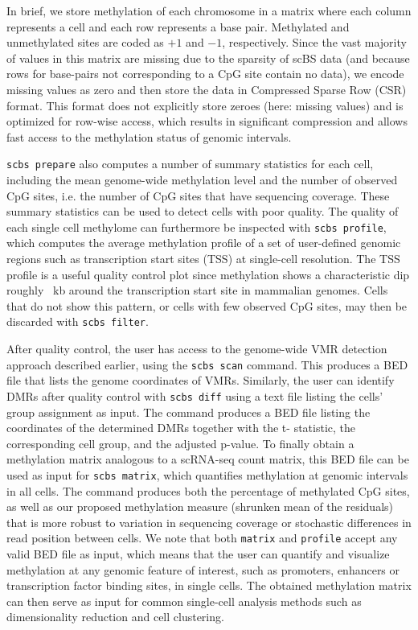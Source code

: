 \documentclass[twocolumn,10pt]{article}
\begin{document}
In brief, we store methylation of each chromosome in a matrix where each column represents a cell and each row represents a base pair.
Methylated and unmethylated sites are coded as $+1$ and $-1$, respectively.
Since the vast majority of values in this matrix are missing due to the sparsity of scBS data (and because rows for base-pairs not corresponding to a CpG site contain no data), we encode missing values as zero and then store the data in Compressed Sparse Row (CSR) format.
This format does not explicitly store zeroes (here: missing values) and is optimized for row-wise access, which results in significant compression and allows fast access to the methylation status of genomic intervals.

\texttt{scbs prepare} also computes a number of summary statistics for each cell, including the mean genome-wide methylation level and the number of observed CpG sites, i.e.
the number of CpG sites that have sequencing coverage.
These summary statistics can be used to detect cells with poor quality.
The quality of each single cell methylome can furthermore be inspected with \texttt{scbs profile}, which computes the average methylation profile of a set of user-defined genomic regions such as transcription start sites (TSS) at single-cell resolution.
The TSS profile is a useful quality control plot since methylation shows a characteristic dip roughly ~kb around the transcription start site in mammalian genomes.
Cells that do not show this pattern, or cells with few observed CpG sites, may then be discarded with \texttt{scbs filter}.


After quality control, the user has access to the genome-wide VMR detection approach described earlier, using the \texttt{scbs scan} command.
This produces a BED file that lists the genome coordinates of VMRs.
Similarly, the user can identify DMRs after quality control with \texttt{scbs diff} using a text file listing the cells’ group assignment as input.
The command produces a BED file listing the coordinates of the determined DMRs together with the t- statistic, the corresponding cell group, and the adjusted p-value.
To finally obtain a methylation matrix analogous to a scRNA-seq count matrix, this BED file can be used as input for \texttt{scbs matrix}, which quantifies methylation at genomic intervals in all cells.
The command produces both the percentage of methylated CpG sites, as well as our proposed methylation measure (shrunken mean of the residuals) that is more robust to variation in sequencing coverage or stochastic differences in read position between cells.
We note that both \texttt{matrix} and \texttt{profile} accept any valid BED file as input, which means that the user can quantify and visualize methylation at any genomic feature of interest, such as promoters, enhancers or transcription factor binding sites, in single cells.
The obtained methylation matrix can then serve as input for common single-cell analysis methods such as dimensionality reduction and cell clustering.
\end{document}
